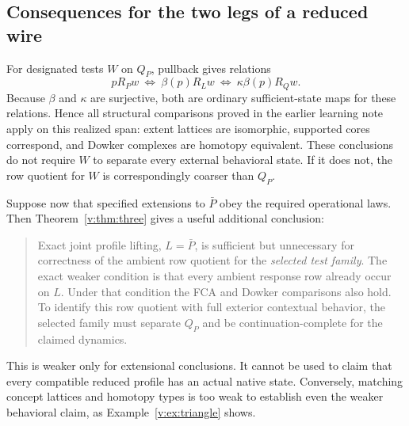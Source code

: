 \documentclass[11pt]{article}
\theoremstyle{definition}
\theoremstyle{remark}\newtheorem{remark}[theorem]{Remark}
\begin{document}
\subsection{Consequences for the two legs of a reduced wire}
For designated tests $W$ on $Q_P$, pullback gives relations
\begin{equation}
 pR_Pw\ \Longleftrightarrow\ \beta(p)R_Lw
 \ \Longleftrightarrow\ \kappa\beta(p)R_Qw.
 \label{v:eq:exact-realized}
\end{equation}
Because $\beta$ and $\kappa$ are surjective, both are ordinary
sufficient-state maps for these relations. Hence all structural
comparisons proved in the earlier learning note~\cite{LearningNote} apply on this realized
span: extent lattices are isomorphic, supported cores correspond, and
Dowker complexes are homotopy equivalent. These conclusions do not
require $W$ to separate every external behavioral state. If it does not,
the row quotient for $W$ is correspondingly coarser than $Q_P$.

Suppose now that specified extensions to $\bar P$ obey the required
operational laws. Then Theorem~\ref{v:thm:three} gives a useful additional
conclusion:
\begin{quote}
Exact joint profile lifting, $L=\bar P$, is sufficient but unnecessary
for correctness of the ambient row quotient for the \emph{selected test
family}. The exact
weaker condition is that every ambient response row already occur on
$L$. Under that condition the FCA and Dowker comparisons also hold.
To identify this row quotient with full exterior contextual behavior, the
selected family must separate $Q_P$ and be continuation-complete for the
claimed dynamics.
\end{quote}
This is weaker only for extensional conclusions. It cannot be used to
claim that every compatible reduced profile has an actual native state.
Conversely, matching concept lattices and homotopy types is too weak to
establish even the weaker behavioral claim, as Example~\ref{v:ex:triangle}
shows.
\end{document}
